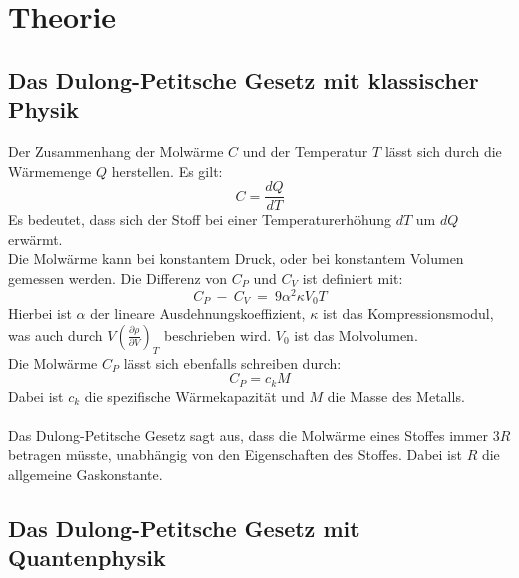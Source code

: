 \section{Theorie}
\label{sec:Theorie}

\subsection{Das Dulong-Petitsche Gesetz mit klassischer Physik}

Der Zusammenhang der Molwärme $C$ und der Temperatur $T$ lässt sich durch die Wärmemenge $Q$ herstellen.
Es gilt:
\begin{equation}
    C = \frac{dQ}{dT}
\end{equation}
Es bedeutet, dass sich der Stoff bei einer Temperaturerhöhung $dT$ um $dQ$ erwärmt.\\
Die Molwärme kann bei konstantem Druck, oder bei konstantem Volumen gemessen werden.
Die Differenz von $C_P$ und $C_V$ ist definiert mit:
\begin{equation}
    C_P\ -\ C_V \ =\ 9\alpha^2 \kappa V_0 T
\end{equation}
Hierbei ist $\alpha$ der lineare Ausdehnungskoeffizient, $\kappa$ ist das Kompressionsmodul, was auch durch $V(\frac{\partial\rho}{\partial V})_T$ beschrieben wird.
$V_0$ ist das Molvolumen.\\
Die Molwärme $C_P$ lässt sich ebenfalls schreiben durch:
\begin{equation}
    C_P = c_kM
\end{equation}
Dabei ist $c_k$ die spezifische Wärmekapazität und $M$ die Masse des Metalls.
\\
\
\\
Das Dulong-Petitsche Gesetz sagt aus, dass die Molwärme eines Stoffes immer $3R$ betragen müsste, unabhängig von den Eigenschaften des Stoffes.
Dabei ist $R$ die allgemeine Gaskonstante.

\subsection{Das Dulong-Petitsche Gesetz mit Quantenphysik}